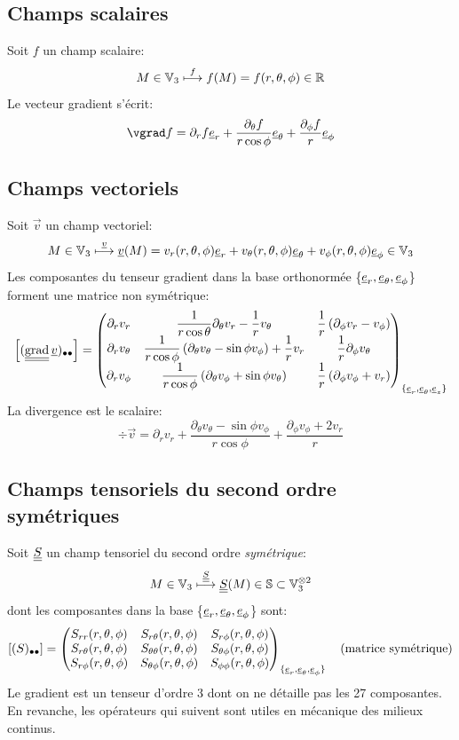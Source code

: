 \documentclass[10pt]{book}
\begin{document}
\begin{appendices}
\subsection{Champs scalaires}
Soit $f$ un champ scalaire:
$$M\in \mathbb{V}_{3}\overset{f}{\longmapsto}f(M)=f(r,\theta,\phi)\in \mathbb{R}$$
Le vecteur gradient s'écrit:
$$\vgrad f=\partial_{r}f\er+\dfrac{\partial_{\theta}f}{r\cos\phi}\etheta+\frac{\partial_{\phi}f}{r}\e_{\phi}$$
\subsection{Champs vectoriels}
Soit $\vec{v}$ un champ vectoriel:
$$M\in \mathbb{V}_{3}\overset{\underline{v}}{\longmapsto}\underline{v}(M)=v_{r}(r,\theta,\phi)\underline{e}_{r} +v_{\theta}(r,\theta,\phi)\underline{e}_{\theta}+v_{\phi}(r,\theta,\phi)\underline{e}_{\phi}\in \mathbb{V}_{3}$$
Les composantes du tenseur gradient dans la base orthonormée \{$\underline{e}_{r},\underline{e}_{\theta}, \underline{e}_{\phi}$\} forment une matrice non symétrique:
\begin{equation}
\left[(\tgrad \vec{v})_{\bullet\bullet}\right]=\begin{pmatrix}
\partial_{r}v_{r} & \dfrac{1}{r\cos\theta}\partial_{\theta}v_{r}-\dfrac{1}{r}v_{\theta} & \dfrac{1}{r}\left(\partial_{\phi}v_{r}-v_{\phi}\right)\\
\partial_{r}v_{\theta} & \dfrac{1}{r\cos\phi}\left(\partial_{\theta}v_{\theta}-\sin\phi v_{\phi}\right)+\dfrac{1}{r}v_{r} & \dfrac{1}{r}\partial_{\phi}v_{\theta}\\
\partial_{r}v_{\phi} & \dfrac{1}{r\cos\phi}\left(\partial_{\theta}v_{\phi}+\sin\phi v_{\theta}\right) & \dfrac{1}{r}\left(\partial_{\phi}v_{\phi}+v_{r}\right)\\
\end{pmatrix}_{\{\er,\etheta,\ez\}}
\label{eq:formulaire_grad_sph_vec}
\end{equation}
La divergence est le scalaire:
$$\div\vec{v}=\partial_{r}v_{r}+\frac{\partial_{\theta}v_{\theta}-\sin\phi v_{\phi}}{r\cos\phi}+\frac{\partial_{\phi}v_{\phi}+2v_{r}}{r}$$
\subsection{Champs tensoriels du second ordre symétriques}
Soit $\underline{\underline{S}}$ un champ tensoriel du second ordre \emph{symétrique}:
$$M\in \mathbb{V}_{3}\overset{\underline{\underline{S}}}{\longmapsto} \underline{\underline{S}}(M)\in \mathbb{S}\subset \mathbb{V}_{3}^{\otimes 2}$$
dont les composantes dans la base \{$\underline{e}_{r},\underline{e}_{\theta}, \underline{e}_{\phi}$\} sont:
$$[(S)_{\bullet\bullet}]=\begin{pmatrix}
S_{rr}(r,\theta,\phi) & S_{r\theta}(r, \theta,\phi) & S_{r\phi}(r, \theta,\phi)\\
S_{r\theta}(r, \theta,\phi) & S_{\theta\theta}(r, \theta,\phi) & S_{\theta\phi}(r, \theta,\phi)\\
S_{r\phi}(r, \theta,\phi) & S_{\theta\phi}(r, \theta,\phi) & S_{\phi\phi}(r, \theta,\phi)
\end{pmatrix}_{\{\underline{e}_{r},\underline{e}_{\theta},\underline{e}_{\phi}\}} \quad \text{(matrice symétrique)}$$
Le gradient est un tenseur d'ordre 3 dont on ne détaille pas les 27 composantes. En revanche, les opérateurs qui suivent sont utiles en mécanique des milieux continus.


\end{appendices}
\end{document}

